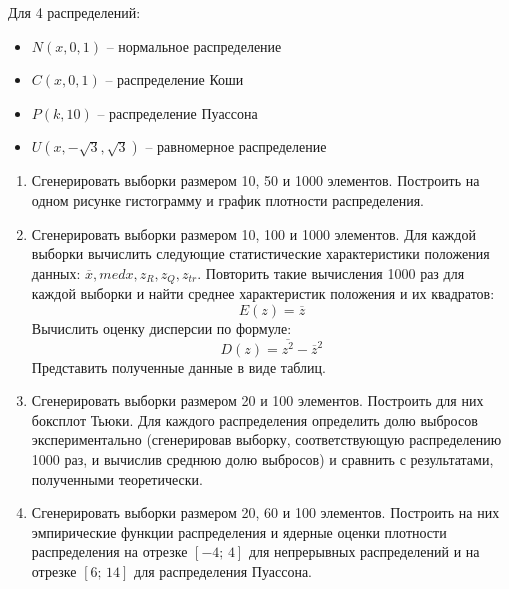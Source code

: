\documentclass[../main.tex]{subfiles}
\begin{document}
    \noindent Для 4 распределений:
	\begin{itemize}
    	\item $N(x, 0, 1)$ -- нормальное распределение
	    \item $C(x, 0, 1)$ -- распределение Коши
    	\item $P(k, 10)$ -- распределение Пуассона
    	\item $U(x, -\sqrt{3}, \sqrt{3})$ -- равномерное распределение
	\end{itemize}

    \begin{enumerate}
        \item Сгенерировать выборки размером 10, 50 и 1000 элементов.
         \newline Построить на одном рисунке гистограмму и график плотности распределения.
    
         \item Сгенерировать выборки размером 10, 100 и 1000 элементов.
         Для каждой выборки вычислить следующие статистические характеристики положения данных: $\overline{x}, med  x, z_R, z_Q, z_{tr}.$ Повторить такие вычисления 1000 раз для каждой выборки и найти среднее характеристик положения и их квадратов:
        \begin{equation}
	        E(z) = \overline{z}
        \end{equation}
            Вычислить оценку дисперсии по формуле:
        \begin{equation}
	        D(z) = \overline{z^2} - \overline{z}^2
        \end{equation}
            Представить полученные данные в виде таблиц.
        \item Сгенерировать выборки размером 20 и 100 элементов.
        Построить для них боксплот Тьюки.
        Для каждого распределения определить долю выбросов экспериментально (сгенерировав выборку, соответствующую распределению 1000 раз, и вычислив среднюю долю выбросов) и сравнить с результатами, полученными теоретически.  
        \item Сгенерировать выборки размером 20, 60 и 100 элементов. Построить на них эмпирические функции распределения и ядерные оценки плотности распределения на отрезке $[-4;\,4]$ для непрерывных распределений и на отрезке $[6;\,14]$ для распределения Пуассона.
    \end{enumerate}
\end{document}

